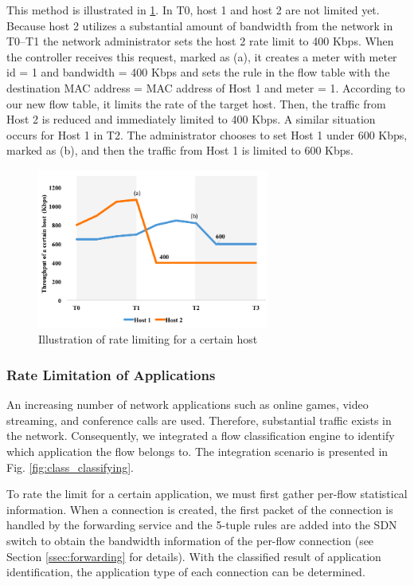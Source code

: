 \documentclass[10pt,journal]{IEEEtran}
\begin{document}
This method is illustrated in \ref{fig:mft_qos_rate_host}. In T0, host 1 and host 2 are not limited yet. Because host 2 utilizes a substantial amount of bandwidth from the network in T0–T1  the network administrator sets the host 2 rate limit to 400 Kbps. When the controller receives this request, marked as (a), it creates a meter with meter id = 1 and bandwidth = 400 Kbps and sets the rule in the flow table with the destination MAC address = MAC address of Host 1 and meter = 1. According to our new flow table, it limits the rate of the target host. Then, the traffic from Host 2 is reduced and immediately limited to 400 Kbps. A similar situation occurs for Host 1 in T2. The administrator chooses to set Host 1 under 600 Kbps, marked as (b), and then the traffic from Host 1 is limited to 600 Kbps.

\begin{figure}[!t]
\centering
\includegraphics[width=3in]{./figures/mft_qos_rate_host}
\caption{Illustration of rate limiting for a certain host}
\label{fig:mft_qos_rate_host}
\end{figure}

\subsubsection{Rate Limitation of Applications}

An increasing number of network applications such as online games, video streaming, and conference calls are used. Therefore, substantial traffic exists in the network. Consequently, we integrated a flow classification engine to identify which application the flow belongs to. The integration scenario is presented in Fig. \ref{fig:class_classifying}.

To rate the limit for a certain application, we must first gather per-flow statistical information. When a connection is created, the first packet of the connection is handled by the forwarding service and the 5-tuple rules are added into the SDN switch to obtain the bandwidth information of the per-flow connection (see Section \ref{ssec:forwarding} for details). With the classified result of application identification, the application type of each connection can be determined.
\end{document}
